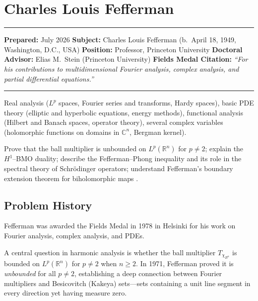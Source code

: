 \chapter{Charles Louis Fefferman}\label{ch1978charleslouisfefferman:charles-louis-fefferman-fields-medal-1978-a-comprehensive-report-on-his-work-and-impact}

\begin{center}\rule{0.5\linewidth}{0.5pt}\end{center}

\textbf{Prepared:} July 2026 \textbf{Subject:} Charles Louis Fefferman
(b.\ April 18, 1949, Washington, D.C., USA) \textbf{Position:}
Professor, Princeton University \textbf{Doctoral Advisor:} Elias M.\
Stein (Princeton University) \textbf{Fields Medal Citation:}
\emph{``For his contributions to multidimensional Fourier analysis,
complex analysis, and partial differential equations.''}

\begin{center}\rule{0.5\linewidth}{0.5pt}\end{center}

\begin{prereqs} Real analysis ($L^p$ spaces, Fourier series and
transforms, Hardy spaces), basic PDE theory (elliptic and hyperbolic
equations, energy methods), functional analysis (Hilbert and Banach
spaces, operator theory), several complex variables (holomorphic
functions on domains in $\mathbb{C}^n$, Bergman kernel).
\end{prereqs}

\begin{objectives} Prove that the ball multiplier is unbounded on
$L^p(\mathbb{R}^n)$ for $p \ne 2$; explain the $H^1$--BMO duality;
describe the Fefferman--Phong inequality and its role in the spectral
theory of Schr\"{o}dinger operators; understand Fefferman's boundary
extension theorem for biholomorphic maps \cite{fefferman1974}.
\end{objectives}

\section{Problem History}

Fefferman was awarded the Fields Medal in 1978 in Helsinki for his work
on Fourier analysis, complex analysis, and PDEs.

A central question in harmonic analysis is whether the ball multiplier
$T_{\chi_{B^n}}$ is bounded on $L^p(\mathbb{R}^n)$ for $p \ne 2$ when
$n \ge 2$. In 1971, Fefferman proved it is \emph{unbounded} for all
$p \ne 2$, establishing a deep connection between Fourier multipliers
and Besicovitch (Kakeya) sets---sets containing a unit line segment in
every direction yet having measure zero.

